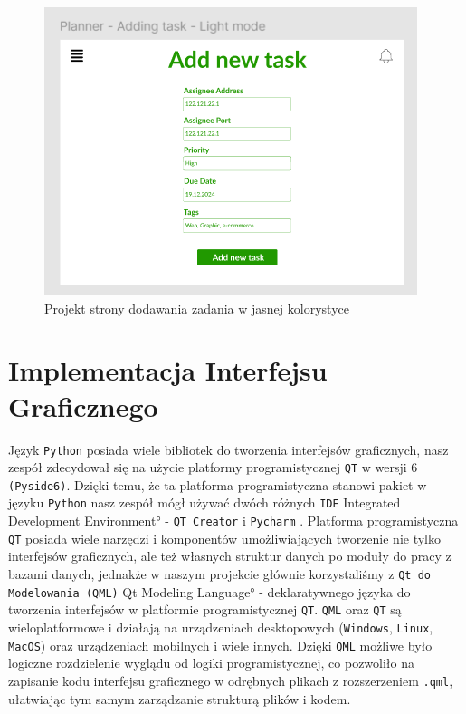 \begin{figure}[!ht]
    \centering
    \includegraphics[width=0.75\linewidth]{Images/figma_projektowanie_3.png}
    \caption{Projekt strony dodawania zadania w jasnej kolorystyce}
    \label{fig:enter-label}
\end{figure}

\section{Implementacja Interfejsu Graficznego}
\label{sec:ImplementacjaInterfejsuGraficznego}
Język \texttt{Python} posiada wiele bibliotek do tworzenia interfejsów graficznych, nasz zespół zdecydował się na użycie platformy programistycznej \texttt{QT} w wersji 6 \texttt{(Pyside6)}. Dzięki temu, że ta platforma programistyczna stanowi pakiet w języku \texttt{Python} nasz zespół mógł używać dwóch różnych \texttt{IDE} \ang{Integrated Development Environment} - \texttt{QT Creator} \cite{QT-Creator} i \texttt{Pycharm} \cite{Pycharm}.
Platforma programistyczna \texttt{QT} posiada wiele narzędzi i komponentów umożliwiających tworzenie nie tylko interfejsów graficznych, ale też własnych struktur danych po moduły do pracy z bazami danych, jednakże w naszym projekcie głównie korzystaliśmy z \texttt{Qt do Modelowania (QML)} \ang{Qt Modeling Language} - deklaratywnego języka do tworzenia interfejsów w platformie programistycznej \texttt{QT}. \texttt{QML} oraz \texttt{QT} są wieloplatformowe i działają na urządzeniach desktopowych (\texttt{Windows}, \texttt{Linux}, \texttt{MacOS}) oraz urządzeniach mobilnych i wiele innych.
Dzięki \texttt{QML} możliwe było logiczne rozdzielenie wyglądu od logiki programistycznej, co pozwoliło na zapisanie kodu interfejsu graficznego w odrębnych plikach z rozszerzeniem \texttt{.qml}, ułatwiając tym samym zarządzanie strukturą plików i kodem.

